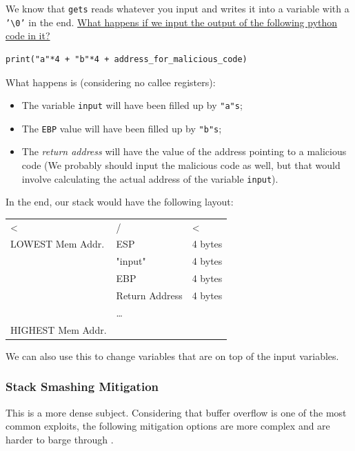\documentclass[11pt]{article}
\begin{document}
We know that \texttt{gets} reads whatever you input and writes it into a variable with a \texttt{'\textbackslash{}0'} in the end. \uline{What happens if we input the output of the following python code in it?}

\begin{verbatim}
print("a"*4 + "b"*4 + address_for_malicious_code)
\end{verbatim}

What happens is (considering no callee registers):
\begin{itemize}
\item The variable \texttt{input} will have been filled up by \texttt{"a"s};
\item The \texttt{EBP} value will have been filled up by \texttt{"b"s};
\item The \emph{return address} will have the value of the address pointing to a malicious code (We probably should input the malicious code as well, but that would involve calculating the actual address of the variable \texttt{input}).
\end{itemize}

In the end, our stack would have the following layout:

\begin{center}
\begin{tabular}{lll}
\hline
< & / & <\\
LOWEST Mem Addr. & ESP & 4 bytes\\
\hline
 & "input" & 4 bytes\\
\hline
 & EBP & 4 bytes\\
\hline
 & Return Address & 4 bytes\\
\hline
 & \ldots{} & \\
\hline
HIGHEST Mem Addr. &  & \\
\hline
\end{tabular}
\end{center}

We can also use this to change variables that are on top of the input variables.

\subsubsection{Stack Smashing Mitigation}
\label{sec:org12ffea2}
This is a more dense subject. Considering that buffer overflow is one of the most common exploits, the following mitigation options are more complex and are harder to barge through \cite{MemoryDefenseSlide}.
\end{document}

